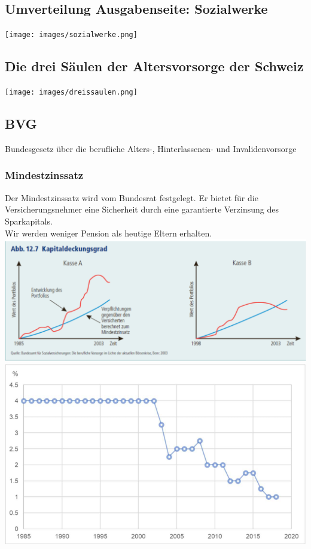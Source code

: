 \clearpage
\pagebreak
\subsection{Umverteilung Ausgabenseite: Sozialwerke}
\centering
\texttt{[image: images/sozialwerke.png]}
\flushleft
\subsection{Die drei Säulen der Altersvorsorge der Schweiz}
\centering
\texttt{[image: images/dreissaulen.png]}
\flushleft

\subsection{BVG}
Bundesgesetz über die berufliche Alters-, Hinterlassenen- und Invalidenvorsorge

\subsubsection{Mindestzinssatz}
\begin{multicols}{2}
Der Mindestzinssatz wird vom Bundesrat festgelegt. Er bietet für die Versicherungsnehmer eine Sicherheit durch eine garantierte Verzinsung des Sparkapitals.\\
Wir werden weniger Pension als heutige Eltern erhalten.
\columnbreak
\includegraphics[width=\linewidth]{images/mindestzinssatz.png}
\includegraphics[width=\linewidth]{images/mindestzinssatz2.png}
\end{multicols}

